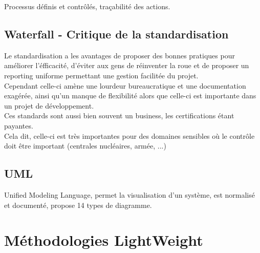 \documentclass{report}
\begin{document}
		Processus définis et contrôlés, traçabilité des actions.\\

	\section{Waterfall - Critique de la standardisation}

		Le standardisation a les avantages de proposer des bonnes pratiques pour améliorer l'éfficacité, d'éviter aux gens de réinventer la roue et de proposer un reporting uniforme permettant une gestion facilitée du projet.\\

		Cependant celle-ci amène une lourdeur bureaucratique et une documentation exagérée, ainsi qu'un manque de flexibilité alors que celle-ci est importante dans un projet de développement.\\

		Ces standards sont aussi bien souvent un business, les certifications étant payantes.\\

		Cela dit, celle-ci est très importantes pour des domaines sensibles où le contrôle doit être important (centrales nucléaires, armée, ...)\\

	\section{UML}

		Unified Modeling Language, permet la visualisation d'un système, est normalisé et documenté, propose 14 types de diagramme.\\

\chapter{Méthodologies LightWeight}
\end{document}
